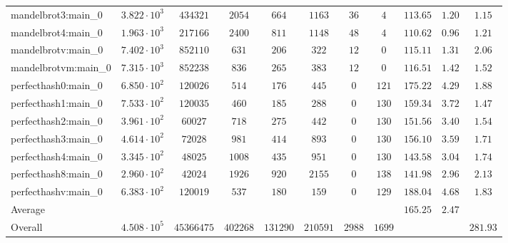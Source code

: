 \begin{tabular}{|l|c|c|c|c|c|c|c|c|c|c|}
mandelbrot3:main\_0            & $ 3.822 \cdot 10^{3} $ & $ 434321   $ & $ 2054   $ & $ 664    $ & $ 1163   $ & $ 36   $ & $ 4    $ & $ 113.65      $ & $ 1.20    $ & $ 1.15    $ \\
mandelbrot4:main\_0            & $ 1.963 \cdot 10^{3} $ & $ 217166   $ & $ 2400   $ & $ 811    $ & $ 1148   $ & $ 48   $ & $ 4    $ & $ 110.62      $ & $ 0.96    $ & $ 1.21    $ \\
mandelbrotv:main\_0            & $ 7.402 \cdot 10^{3} $ & $ 852110   $ & $ 631    $ & $ 206    $ & $ 322    $ & $ 12   $ & $ 0    $ & $ 115.11      $ & $ 1.31    $ & $ 2.06    $ \\
mandelbrotvm:main\_0           & $ 7.315 \cdot 10^{3} $ & $ 852238   $ & $ 836    $ & $ 265    $ & $ 383    $ & $ 12   $ & $ 0    $ & $ 116.51      $ & $ 1.42    $ & $ 1.52    $ \\
perfecthash0:main\_0           & $ 6.850 \cdot 10^{2} $ & $ 120026   $ & $ 514    $ & $ 176    $ & $ 445    $ & $ 0    $ & $ 121  $ & $ 175.22      $ & $ 4.29    $ & $ 1.88    $ \\
perfecthash1:main\_0           & $ 7.533 \cdot 10^{2} $ & $ 120035   $ & $ 460    $ & $ 185    $ & $ 288    $ & $ 0    $ & $ 130  $ & $ 159.34      $ & $ 3.72    $ & $ 1.47    $ \\
perfecthash2:main\_0           & $ 3.961 \cdot 10^{2} $ & $ 60027    $ & $ 718    $ & $ 275    $ & $ 442    $ & $ 0    $ & $ 130  $ & $ 151.56      $ & $ 3.40    $ & $ 1.54    $ \\
perfecthash3:main\_0           & $ 4.614 \cdot 10^{2} $ & $ 72028    $ & $ 981    $ & $ 414    $ & $ 893    $ & $ 0    $ & $ 130  $ & $ 156.10      $ & $ 3.59    $ & $ 1.71    $ \\
perfecthash4:main\_0           & $ 3.345 \cdot 10^{2} $ & $ 48025    $ & $ 1008   $ & $ 435    $ & $ 951    $ & $ 0    $ & $ 130  $ & $ 143.58      $ & $ 3.04    $ & $ 1.74    $ \\
perfecthash8:main\_0           & $ 2.960 \cdot 10^{2} $ & $ 42024    $ & $ 1926   $ & $ 920    $ & $ 2155   $ & $ 0    $ & $ 138  $ & $ 141.98      $ & $ 2.96    $ & $ 2.13    $ \\
perfecthashv:main\_0           & $ 6.383 \cdot 10^{2} $ & $ 120019   $ & $ 537    $ & $ 180    $ & $ 159    $ & $ 0    $ & $ 129  $ & $ 188.04      $ & $ 4.68    $ & $ 1.83    $ \\
\hline
Average                        & $                    $ & $          $ & $        $ & $        $ & $        $ & $      $ & $      $ & $ 165.25      $ & $ 2.47    $ & $         $ \\
\hline
Overall                        & $ 4.508 \cdot 10^{5} $ & $ 45366475 $ & $ 402268 $ & $ 131290 $ & $ 210591 $ & $ 2988 $ & $ 1699 $ & $             $ & $         $ & $ 281.93  $ \\
\hline
\end{tabular}
